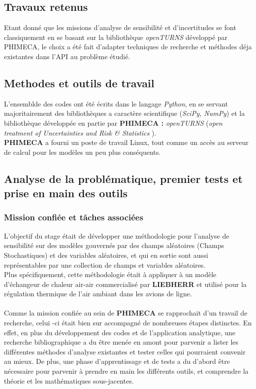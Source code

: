 \documentclass[a4paper,10pt]{article}
\begin{document}
\subsection{Travaux retenus}
Etant donné que les missions d'analyse de sensibilité et d'incertitudes se font classiquement en se basant sur la bibliothèque \textit{openTURNS} développé par PHIMECA, le choix a été fait d'adapter techniques de recherche et méthodes déja existantes dans l'API au problème étudié. 


\subsection{Methodes et outils de travail}
L'ensemblde des codes ont été écrits dans le langage \textit{Python}, en se servant majoritairement des bibliothèques a caractère scientifique (\textit{SciPy, NumPy}) et la bibliothèque développée en partie par \textbf{PHIMECA :} \textit{openTURNS} (\emph{open treatment of Uncertainties and Risk \& Statistics })\cite{OpenTURNS}.\\
\textbf{PHIMECA} a fourni un poste de travail Linux, tout comme un accès au serveur de calcul pour les modèles un peu plus conséquents. \\

\subsection[Prémices]{Analyse de la problématique, premier tests et prise en main des outils}

\subsubsection{Mission confiée et tâches associées}
L'objectif du stage était de développer une méthodologie pour l'analyse de sensibilité sur des modèles gouvernés par des champs aléatoires (Champs Stochastiques) et des variables aléatoires, et qui en sortie sont aussi représentables par une collection de champs et variables aléatoires. \\
Plus spécifiquement, cette méthodologie était à appliquer à un modèle d'échangeur de chaleur air-air commercialisé par \textbf{LIEBHERR} et utilisé pour la régulation thermique de l'air ambiant dans les avions de ligne.\\\\
Comme la mission confiée au sein de \textbf{PHIMECA} se rapprochait d'un travail de recherche, celui -ci était bien sur accompagné de nombreuses étapes distinctes. En effet, en plus du développement des codes et de l'application analytique, une recherche bibliographique a du être menée en amont pour parvenir a lister les différentes méthodes d'analyse existantes et tester celles qui pourraient convenir au mieux. De plus, une phase d'apprentissage et de tests a du d'abord être nécessaire pour parvenir à prendre en main les différents outils, et comprendre la théorie et les mathématiques sous-jacentes.\\
\end{document}
